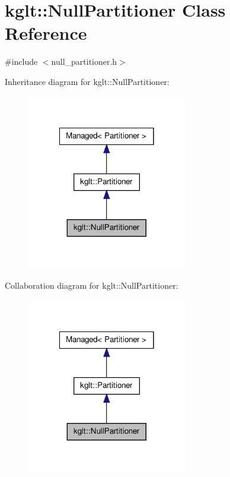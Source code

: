 \hypertarget{classkglt_1_1_null_partitioner}{\section{kglt\-:\-:Null\-Partitioner Class Reference}
\label{classkglt_1_1_null_partitioner}
}


{\ttfamily \#include $<$null\-\_\-partitioner.\-h$>$}



Inheritance diagram for kglt\-:\-:Null\-Partitioner\-:\nopagebreak
\begin{figure}[H]
\begin{center}
\leavevmode
\includegraphics[width=198pt]{classkglt_1_1_null_partitioner__inherit__graph}
\end{center}
\end{figure}


Collaboration diagram for kglt\-:\-:Null\-Partitioner\-:\nopagebreak
\begin{figure}[H]
\begin{center}
\leavevmode
\includegraphics[width=198pt]{classkglt_1_1_null_partitioner__coll__graph}
\end{center}
\end{figure}
